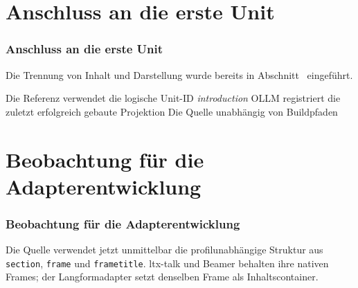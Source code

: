 \documentclass{osglecture}
\begin{document}

\section{Anschluss an die erste Unit}
\begin{frame}
  \frametitle{Anschluss an die erste Unit}
  Die Trennung von Inhalt und Darstellung wurde bereits in
  Abschnitt~ eingeführt.

  \begin{presitemize}
    \item Die Referenz verwendet die logische Unit-ID \emph{introduction}
    \anditem OLLM registriert die zuletzt erfolgreich gebaute Projektion
    \thereforeitem Die Quelle  unabhängig von Buildpfaden
  \end{presitemize}
\end{frame}

\section{Beobachtung für die Adapterentwicklung}
\begin{frame}
  \frametitle{Beobachtung für die Adapterentwicklung}
  Die Quelle verwendet jetzt unmittelbar die profilunabhängige Struktur aus
  \texttt{section}, \texttt{frame} und \texttt{frametitle}. ltx-talk und
  Beamer behalten ihre nativen Frames; der Langformadapter setzt denselben
  Frame als Inhaltscontainer.
\end{frame}
\end{document}
